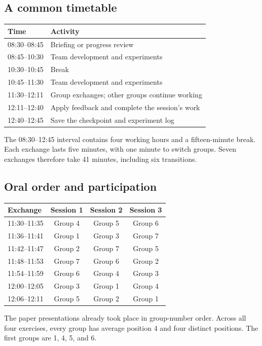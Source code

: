 \documentclass[11pt,a4paper]{article}
\begin{document}
\subsection{A common timetable}
\begin{center}\begin{tabular}{ll}\toprule
Time & Activity\\\midrule
08:30--08:45 & Briefing or progress review\\
08:45--10:30 & Team development and experiments\\
10:30--10:45 & Break\\
10:45--11:30 & Team development and experiments\\
11:30--12:11 & Group exchanges; other groups continue working\\
12:11--12:40 & Apply feedback and complete the session's work\\
12:40--12:45 & Save the checkpoint and experiment log\\\bottomrule
\end{tabular}\end{center}
The 08:30--12:45 interval contains four working hours and a fifteen-minute break. Each exchange lasts five minutes, with one minute to switch groups. Seven exchanges therefore take 41 minutes, including six transitions.

\subsection{Oral order and participation}
\begin{center}\begin{tabular}{lccc}\toprule
Exchange & Session 1 & Session 2 & Session 3\\\midrule
11:30--11:35 & Group 4 & Group 5 & Group 6\\
11:36--11:41 & Group 1 & Group 3 & Group 7\\
11:42--11:47 & Group 2 & Group 7 & Group 5\\
11:48--11:53 & Group 7 & Group 6 & Group 2\\
11:54--11:59 & Group 6 & Group 4 & Group 3\\
12:00--12:05 & Group 3 & Group 1 & Group 4\\
12:06--12:11 & Group 5 & Group 2 & Group 1\\\bottomrule
\end{tabular}\end{center}
The paper presentations already took place in group-number order. Across all four exercises, every group has average position 4 and four distinct positions. The first groups are 1, 4, 5, and 6.
\end{document}
